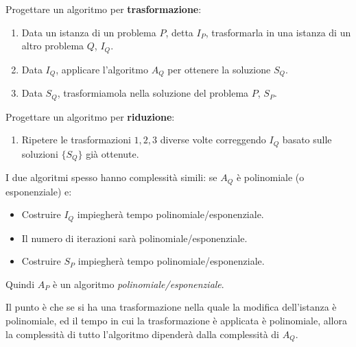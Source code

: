 \documentclass{article}
\begin{document}
Progettare un algoritmo per \textbf{trasformazione}:
\begin{enumerate}
    \item Data un istanza di un problema $P$, detta $I_P$, trasformarla in
          una istanza di un altro problema $Q$, $I_Q$.
    \item Data $I_Q$, applicare l'algoritmo $A_Q$ per ottenere la soluzione $S_Q$.
    \item Data $S_Q$, trasformiamola nella soluzione del problema $P$, $S_P$.
\end{enumerate}

Progettare un algoritmo per \textbf{riduzione}:
\begin{enumerate}
    \item Ripetere le trasformazioni $1,2,3$ diverse volte correggendo $I_Q$ basato sulle soluzioni
          $\{S_Q\}$ già ottenute.
\end{enumerate}

I due algoritmi spesso hanno complessità simili: se $A_Q$ è polinomiale (o esponenziale) e:
\begin{itemize}
    \item Costruire $I_Q$ impiegherà tempo polinomiale/esponenziale.
    \item Il numero di iterazioni sarà polinomiale/esponenziale.
    \item Costruire $S_P$ impiegherà tempo polinomiale/esponenziale.
\end{itemize}

Quindi $A_P$ è un algoritmo \textit{polinomiale/esponenziale}.

Il punto è che se si ha una trasformazione nella quale la modifica dell'istanza è
polinomiale, ed il tempo in cui la trasformazione è applicata è polinomiale, allora la
complessità di tutto l'algoritmo dipenderà dalla complessità di $A_Q$.
\end{document}
